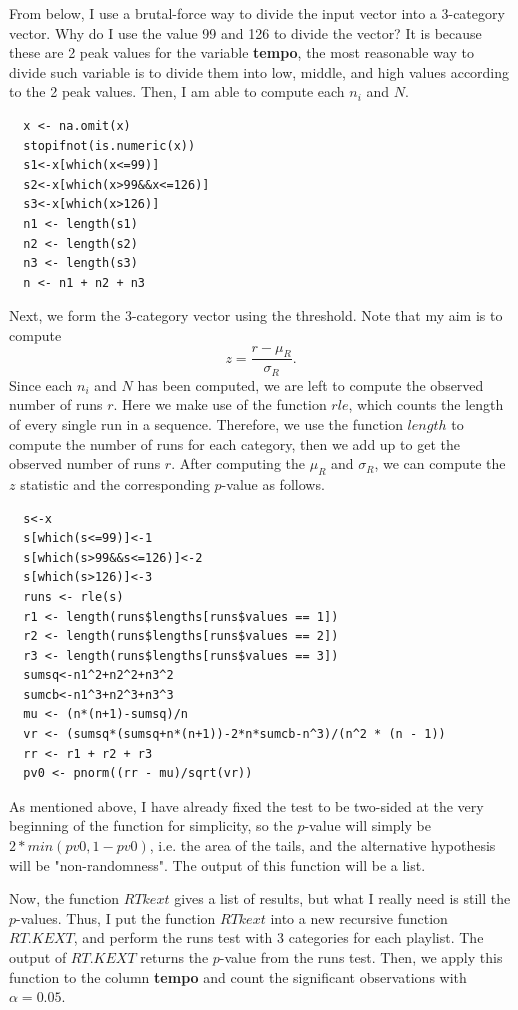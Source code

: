 \documentclass[12pt]{article}
\theoremstyle{plain}
\theoremstyle{definition}
\theoremstyle{remark}
\begin{document}
From below, I use a brutal-force way to divide the input vector into a 3-category vector. Why do I use the value 99 and 126 to divide the vector? It is because these are 2 peak values for the variable \textbf{tempo}, the most reasonable way to divide such variable is to divide them into low, middle, and high values according to the 2 peak values. Then, I am able to compute each $n_i$ and $N$. 
\begin{verbatim}
  x <- na.omit(x)
  stopifnot(is.numeric(x))
  s1<-x[which(x<=99)]
  s2<-x[which(x>99&&x<=126)]
  s3<-x[which(x>126)]
  n1 <- length(s1)
  n2 <- length(s2)
  n3 <- length(s3)
  n <- n1 + n2 + n3
\end{verbatim}
Next, we form the 3-category vector using the threshold. Note that my aim is to compute $$z=\frac{r-\mu_R}{\sigma_R}.$$ Since each $n_i$ and $N$ has been computed, we are left to compute the observed number of runs $r$. Here we make use of the function $rle$, which counts the length of every single run in a sequence. Therefore, we use the function $length$ to compute the number of runs for each category, then we add up to get the observed number of runs $r$. After computing the $\mu_R$ and $\sigma_R$, we can compute the $z$ statistic and the corresponding $p$-value as follows.
\begin{verbatim}
  s<-x
  s[which(s<=99)]<-1
  s[which(s>99&&s<=126)]<-2
  s[which(s>126)]<-3
  runs <- rle(s)
  r1 <- length(runs$lengths[runs$values == 1])
  r2 <- length(runs$lengths[runs$values == 2])
  r3 <- length(runs$lengths[runs$values == 3])
  sumsq<-n1^2+n2^2+n3^2
  sumcb<-n1^3+n2^3+n3^3
  mu <- (n*(n+1)-sumsq)/n
  vr <- (sumsq*(sumsq+n*(n+1))-2*n*sumcb-n^3)/(n^2 * (n - 1))
  rr <- r1 + r2 + r3
  pv0 <- pnorm((rr - mu)/sqrt(vr))
\end{verbatim}  
As mentioned above, I have already fixed the test to be two-sided at the very beginning of the function for simplicity, so the $p$-value will simply be $2 * min(pv0, 1 - pv0)$, i.e. the area of the tails, and the alternative hypothesis will be "non-randomness". The output of this function will be a list.

Now, the function $RTkext$ gives a list of results, but what I really need is still the $p$-values. Thus, I put the function $RTkext$ into a new recursive function $RT.KEXT$, and perform the runs test with 3 categories for each playlist. The output of $RT.KEXT$ returns the $p$-value from the runs test. Then, we apply this function to the column \textbf{tempo} and count the significant observations with $\alpha=0.05$. 
\end{document}

